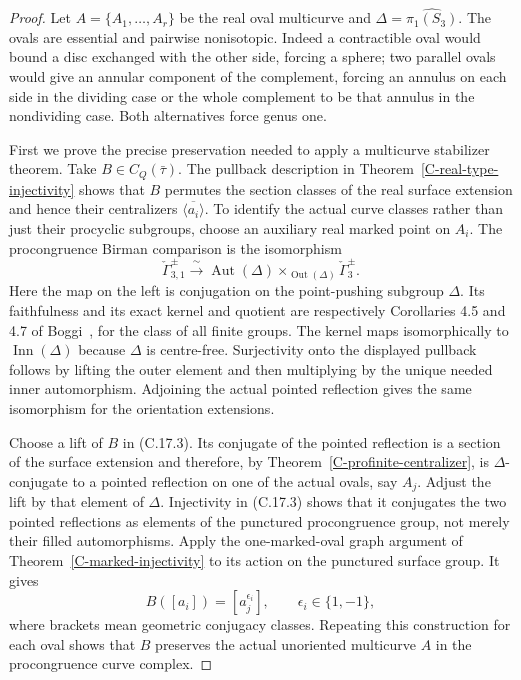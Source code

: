 \begin{proof}
Let $A=\{A_1,\ldots,A_r\}$ be the real oval multicurve and
$\Delta=\widehat{\pi_1(S_3)}$. The ovals are essential and
pairwise nonisotopic. Indeed a contractible oval would bound
a disc exchanged with the other side, forcing a sphere;
two parallel ovals would give an annular component of the
complement, forcing an annulus on each side in the dividing
case or the whole complement to be that annulus in the
nondividing case. Both alternatives force genus one.

First we prove the precise preservation needed to apply a
multicurve stabilizer theorem. Take $B\in C_Q(\bar\tau)$.
The pullback description in
Theorem~\ref{C-real-type-injectivity} shows that $B$ permutes
the section classes of the real surface extension and hence
their centralizers $\overline{\langle a_i\rangle}$. To identify
the actual curve classes rather than just their procyclic
subgroups, choose an auxiliary real marked point on $A_i$.
The procongruence Birman comparison is the isomorphism
\[
 \check\Gamma_{3,1}^{\pm}
 \xrightarrow{\ \sim\ }
 \operatorname{Aut}(\Delta)
       \mathbin{\times}_{\operatorname{Out}(\Delta)}
                         \check\Gamma_3^{\pm}.
\tag{C.17.3}
\]
Here the map on the left is conjugation on the point-pushing
subgroup $\Delta$. Its faithfulness and its exact kernel and
quotient are respectively Corollaries 4.5 and 4.7 of
Boggi~\cite{CextraBoggiCongruence2020}, for the class of all
finite groups. The kernel maps isomorphically to
$\operatorname{Inn}(\Delta)$ because $\Delta$ is centre-free.
Surjectivity onto the displayed pullback follows by lifting
the outer element and then multiplying by the unique needed
inner automorphism. Adjoining the actual pointed reflection
gives the same isomorphism for the orientation extensions.

Choose a lift of $B$ in (C.17.3). Its conjugate of the pointed
reflection is a section of the surface extension and therefore,
by Theorem~\ref{C-profinite-centralizer}, is $\Delta$-conjugate
to a pointed reflection on one of the actual ovals, say $A_j$.
Adjust the lift by that element of $\Delta$. Injectivity in
(C.17.3) shows that it conjugates the two pointed reflections
as elements of the punctured procongruence group, not merely
their filled automorphisms. Apply the one-marked-oval graph
argument of Theorem~\ref{C-marked-injectivity} to its action
on the punctured surface group. It gives
\[
 B([a_i])=[a_j^{\epsilon_i}],\qquad
                   \epsilon_i\in\{1,-1\},
\tag{C.17.4}
\]
where brackets mean geometric conjugacy classes. Repeating
this construction for each oval shows that $B$ preserves
the actual unoriented multicurve $A$ in the procongruence
curve complex.


\end{proof}
